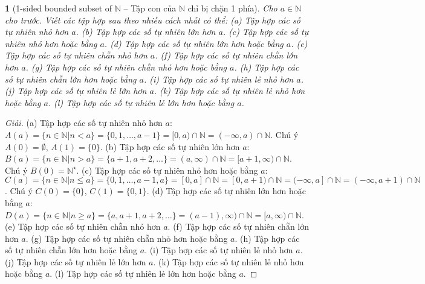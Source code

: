 \documentclass{article}
\newtheorem{baitoan}{}
\begin{document}
\begin{baitoan}[1-sided bounded subset of $\mathbb{N}$ -- Tập con của $\mathbb{N}$ chỉ bị chặn 1 phía]
	Cho $a\in\mathbb{N}$ cho trước. Viết các tập hợp sau theo nhiều cách nhất có thể: (a) Tập hợp các số tự nhiên nhỏ hơn $a$. (b) Tập hợp các số tự nhiên lớn hơn $a$. (c) Tập hợp các số tự nhiên nhỏ hơn hoặc bằng $a$. (d) Tập hợp các số tự nhiên lớn hơn hoặc bằng $a$. (e) Tập hợp các số tự nhiên chẵn nhỏ hơn $a$. (f) Tập hợp các số tự nhiên chẵn lớn hơn $a$. (g) Tập hợp các số tự nhiên chẵn nhỏ hơn hoặc bằng $a$. (h) Tập hợp các số tự nhiên chẵn lớn hơn hoặc bằng $a$. (i) Tập hợp các số tự nhiên lẻ nhỏ hơn $a$. (j) Tập hợp các số tự nhiên lẻ lớn hơn $a$. (k) Tập hợp các số tự nhiên lẻ nhỏ hơn hoặc bằng $a$. (l) Tập hợp các số tự nhiên lẻ lớn hơn hoặc bằng $a$.
\end{baitoan}

\begin{proof}[Giải]
	(a) Tập hợp các số tự nhiên nhỏ hơn $a$: $A(a) = \{n\in\mathbb{N}|n < a\} = \{0,1,\ldots,a - 1\} = [0,a)\cap\mathbb{N} = (-\infty,a)\cap\mathbb{N}$. Chú ý $A(0) = \emptyset$, $A(1) = \{0\}$. (b) Tập hợp các số tự nhiên lớn hơn $a$: $B(a) = \{n\in\mathbb{N}|n > a\} = \{a + 1,a + 2,\ldots\} = (a,\infty)\cap\mathbb{N} = [a + 1,\infty)\cap\mathbb{N}$. Chú ý $B(0) = \mathbb{N}^\star$. (c) Tập hợp các số tự nhiên nhỏ hơn hoặc bằng $a$: $C(a) = \{n\in\mathbb{N}|n\le a\} = \{0,1,\ldots,a - 1,a\} = [0,a]\cap\mathbb{N} = [0,a + 1)\cap\mathbb{N} = (-\infty,a]\cap\mathbb{N} = (-\infty,a + 1)\cap\mathbb{N}$. Chú ý $C(0) = \{0\}$, $C(1) = \{0,1\}$. (d) Tập hợp các số tự nhiên lớn hơn hoặc bằng $a$: $D(a) = \{n\in\mathbb{N}|n\ge a\} = \{a,a + 1,a + 2,\ldots\} = (a - 1),\infty)\cap\mathbb{N} = [a,\infty)\cap\mathbb{N}$. (e) Tập hợp các số tự nhiên chẵn nhỏ hơn $a$. (f) Tập hợp các số tự nhiên chẵn lớn hơn $a$. (g) Tập hợp các số tự nhiên chẵn nhỏ hơn hoặc bằng $a$. (h) Tập hợp các số tự nhiên chẵn lớn hơn hoặc bằng $a$. (i) Tập hợp các số tự nhiên lẻ nhỏ hơn $a$. (j) Tập hợp các số tự nhiên lẻ lớn hơn $a$. (k) Tập hợp các số tự nhiên lẻ nhỏ hơn hoặc bằng $a$. (l) Tập hợp các số tự nhiên lẻ lớn hơn hoặc bằng $a$.
\end{proof}
\end{document}
